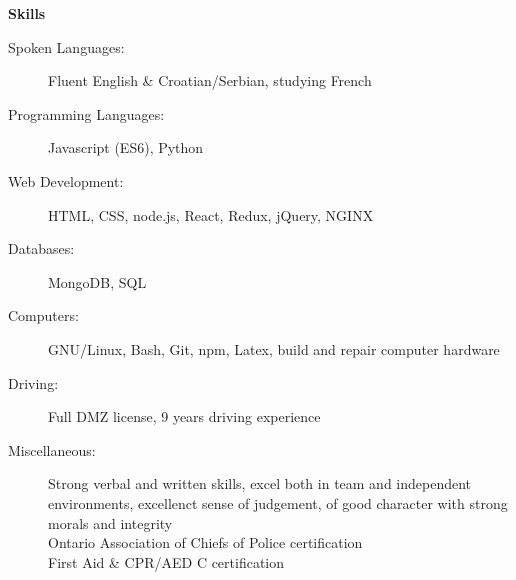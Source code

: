 \documentclass[letterpaper,11pt]{article}
\begin{document}
\begin{mdframed}[backgroundcolor=light-gray]
\textbf{Skills}
\end{mdframed}

\begin{description}
\item[Spoken Languages:]
Fluent English \& Croatian/Serbian, studying French
\item[Programming Languages:]
Javascript (ES6), Python
\item[Web Development:]
HTML, CSS, node.js, React, Redux, jQuery, NGINX
\item[Databases:]
MongoDB, SQL
\item[Computers:]
GNU/Linux, Bash, Git, npm, Latex, build and repair computer hardware
\item[Driving:]
Full DMZ license, 9 years driving experience
\item[Miscellaneous:]
Strong verbal and written skills, excel both in team and independent environments, excellenct sense of judgement, of good character with strong morals and integrity \\
Ontario Association of Chiefs of Police certification \\
First Aid \& CPR/AED C certification
\end{description}
\end{document}
